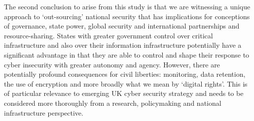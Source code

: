 \documentclass[a4paper,11pt]{article}
\begin{document}
The second conclusion to arise from this study is that we are
witnessing a unique approach to `out-sourcing' national security that
has implications for conceptions of governance, state power, global
security and international partnerships and resource-sharing. States
with greater government control over critical infrastructure and also
over their information infrastructure potentially have a significant
advantage in that they are able to control and shape their response to
cyber insecurity with greater autonomy and agency. However, there are
potentially profound consequences for civil liberties: monitoring,
data retention, the use of encryption and more broadly what we mean by
`digital rights'. This is of particular relevance to emerging UK cyber
security strategy and needs to be considered more thoroughly from a
research, policymaking and national infrastructure perspective.



\end{document}
